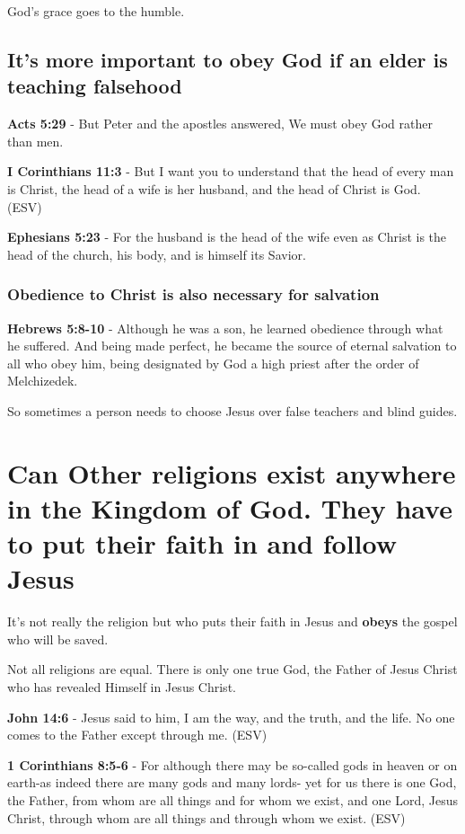 \documentclass[11pt]{article}
\begin{document}
God's grace goes to the humble.

\subsection{It's more important to obey God if an elder is teaching falsehood}
\label{sec:orgf7ca520}
\textbf{Acts 5:29} - But Peter and the apostles answered, We must obey God rather than men.

\textbf{I Corinthians 11:3} - But I want you to understand that the head of every man is Christ, the head of a wife is her husband, and the head of Christ is God. (ESV)

\textbf{Ephesians 5:23} - For the husband is the head of the wife even as Christ is the head of the church, his body, and is himself its Savior.

\subsubsection{Obedience to Christ is also necessary for salvation}
\label{sec:org98e86f8}
\textbf{Hebrews 5:8-10} - Although he was a son, he learned obedience through what he suffered. And being made perfect, he became the source of eternal salvation to all who obey him, being designated by God a high priest after the order of Melchizedek.

So sometimes a person needs to choose Jesus over false teachers and blind guides.

\section{Can Other religions exist anywhere in the Kingdom of God. They have to put their faith in and follow Jesus}
\label{sec:orgaa77a97}
It's not really the religion but who puts their faith in Jesus and \textbf{obeys} the gospel who will be saved.

Not all religions are equal.
There is only one true God, the Father of Jesus Christ who has revealed Himself in Jesus Christ.

\textbf{John 14:6} - Jesus said to him, I am the way, and the truth, and the life. No one comes to the Father except through me. (ESV)

\textbf{1 Corinthians 8:5-6} - For although there may be so-called gods in heaven or on earth-as indeed there are many gods and many lords- yet for us there is one God, the Father, from whom are all things and for whom we exist, and one Lord, Jesus Christ, through whom are all things and through whom we exist. (ESV)
\end{document}
